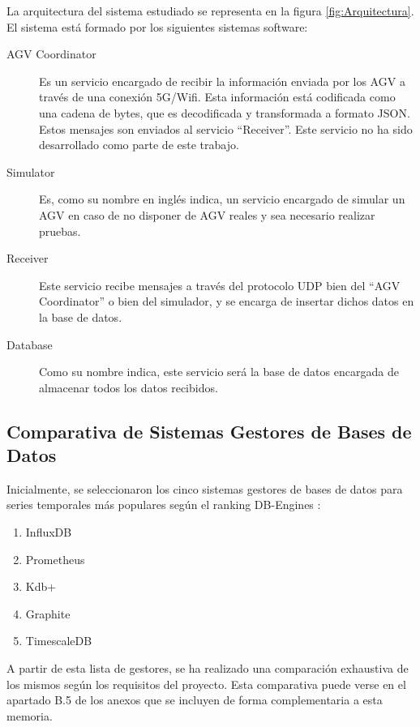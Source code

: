 La arquitectura del sistema estudiado se representa en la figura \ref{fig:Arquitectura}. El sistema
está formado por los siguientes sistemas software:
\begin{description}
    \item [AGV Coordinator] Es un servicio encargado de recibir la información enviada por los AGV a
        través de una conexión 5G/Wifi. Esta información está codificada como una cadena de bytes, que
        es decodificada y transformada a formato JSON. Estos mensajes son enviados al servicio 
        ``Receiver''. Este servicio no ha sido desarrollado como parte de este trabajo.
    \item [Simulator] Es, como su nombre en inglés indica, un servicio encargado de simular un AGV
        en caso de no disponer de AGV reales y sea necesario realizar pruebas.
    \item [Receiver] Este servicio recibe mensajes a través del protocolo UDP bien del ``AGV Coordinator''
        o bien del simulador, y se encarga de insertar dichos datos en la base de datos.
    \item [Database] Como su nombre indica, este servicio será la base de datos encargada de almacenar
        todos los datos recibidos.
\end{description}


\subsection{Comparativa de Sistemas Gestores de Bases de Datos}

Inicialmente, se seleccionaron los cinco sistemas gestores de bases de datos para series temporales más populares 
según el ranking DB-Engines \cite{dbengines:rankingTSDBMS}:
\begin{enumerate}
    \item InfluxDB
    \item Prometheus
    \item Kdb+
    \item Graphite
    \item TimescaleDB
\end{enumerate}

A partir de esta lista de gestores, se ha realizado una comparación exhaustiva de los mismos según los requisitos 
del proyecto. Esta comparativa puede verse en el apartado B.5 de los anexos que se incluyen de forma complementaria 
a esta memoria.

